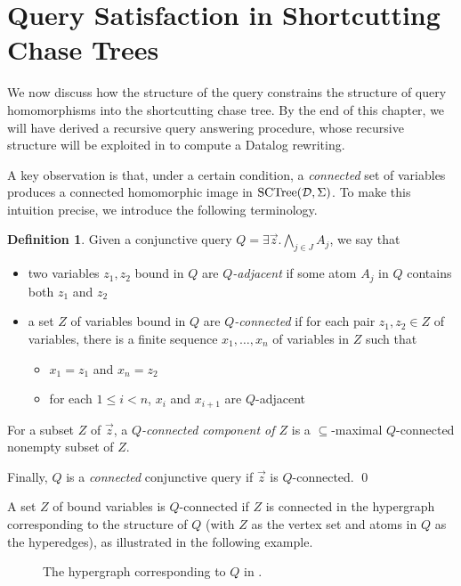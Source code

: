 \documentclass[12pt]{report}
\theoremstyle{plain}
\theoremstyle{definition}
\newtheorem{definition}[theorem]{Definition}
\newcommand{\SCTree}[2]{\ensuremath{\normalfont{\textrm{SCTree}}\!\left( #1, #2 \right)}}
\begin{document}
\section{Query Satisfaction in Shortcutting Chase Trees}

We now discuss how the structure of the query constrains the structure of query homomorphisms into the shortcutting chase tree. By the end of this chapter, we will have derived a recursive query answering procedure, whose recursive structure will be exploited in  to compute a Datalog rewriting.

A key observation is that, under a certain condition, a \emph{connected} set of variables produces a connected homomorphic image in $\SCTree{\mathcal{D}}{\Sigma}$. To make this intuition precise, we introduce the following terminology.

\begin{definition}
  Given a conjunctive query $Q = \exists \vec{z}. \bigwedge_{j \in J} A_j$, we say that
  \begin{itemize}
    \item two variables $z_1, z_2$ bound in $Q$ are \emph{$Q$-adjacent} if some atom $A_j$ in $Q$ contains both $z_1$ and $z_2$
    \item a set $Z$ of variables bound in $Q$ are \emph{$Q$-connected} if for each pair $z_1, z_2 \in Z$ of variables, there is a finite sequence $x_1, \ldots, x_n$ of variables in $Z$ such that
    \begin{itemize}
      \item $x_1 = z_1$ and $x_n = z_2$
      \item for each $1 \leq i < n$, $x_i$ and $x_{i+1}$ are $Q$-adjacent
    \end{itemize}
  \end{itemize}

  For a subset $Z$ of $\vec{z}$, a \emph{$Q$-connected component of $Z$} is a $\subseteq$-maximal $Q$-connected nonempty subset of $Z$.

  Finally, $Q$ is a \emph{connected} conjunctive query if $\vec{z}$ is $Q$-connected.
  \qed
\end{definition}

A set $Z$ of bound variables is $Q$-connected if $Z$ is connected in the hypergraph corresponding to the structure of $Q$ (with $Z$ as the vertex set and atoms in $Q$ as the hyperedges), as illustrated in the following example.

\begin{figure}[ht]
  \centering
  
  \caption{The hypergraph corresponding to $Q$ in .}
\end{figure}
\end{document}
